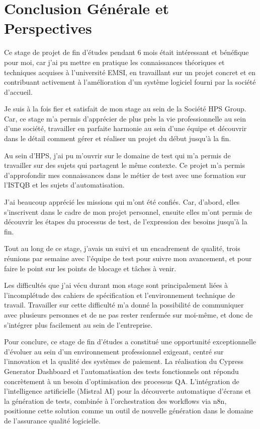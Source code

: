 \newpage
\chapter*{Conclusion Générale et Perspectives}

Ce stage de projet de fin d'études pendant 6 mois était intéressant et bénéfique pour moi, car j'ai pu mettre en pratique les connaissances théoriques et techniques acquises à l'université EMSI, en travaillant sur un projet concret et en contribuant activement à l'amélioration d'un système logiciel fourni par la société d'accueil.

Je suis à la fois fier et satisfait de mon stage au sein de la Société HPS Group. Car, ce stage m'a permis d'apprécier de plus près la vie professionnelle au sein d'une société, travailler en parfaite harmonie au sein d'une équipe et découvrir dans le détail comment gérer et réaliser un projet du début jusqu'à la fin.

Au sein d'HPS, j'ai pu m'ouvrir sur le domaine de test qui m'a permis de travailler sur des sujets qui partagent le même contexte. Ce projet m'a permis d'approfondir mes connaissances dans le métier de test avec une formation sur l'ISTQB et les sujets d'automatisation.

J'ai beaucoup apprécié les missions qui m'ont été confiés. Car, d'abord, elles s'inscrivent dans le cadre de mon projet personnel, ensuite elles m'ont permis de découvrir les étapes du processus de test, de l'expression des besoins jusqu'à la fin.

Tout au long de ce stage, j'avais un suivi et un encadrement de qualité, trois réunions par semaine avec l'équipe de test pour suivre mon avancement, et pour faire le point sur les points de blocage et tâches à venir.

Les difficultés que j'ai vécu durant mon stage sont principalement liées à l'incomplétude des cahiers de spécification et l'environnement technique de travail. Travailler sur cette difficulté m'a donné la possibilité de communiquer avec plusieurs personnes et de ne pas rester renfermée sur moi-même, et donc de s'intégrer plus facilement au sein de l'entreprise.

Pour conclure, ce stage de fin d'études a constitué une opportunité exceptionnelle d'évoluer au sein d'un environnement professionnel exigeant, centré sur l'innovation et la qualité des systèmes de paiement. La réalisation du Cypress Generator Dashboard et l'automatisation des tests fonctionnels ont répondu concrètement à un besoin d'optimisation des processus QA. L'intégration de l'intelligence artificielle (Mistral AI) pour la découverte automatique d'écrans et la génération de tests, combinée à l'orchestration des workflows via n8n, positionne cette solution comme un outil de nouvelle génération dans le domaine de l'assurance qualité logicielle.

